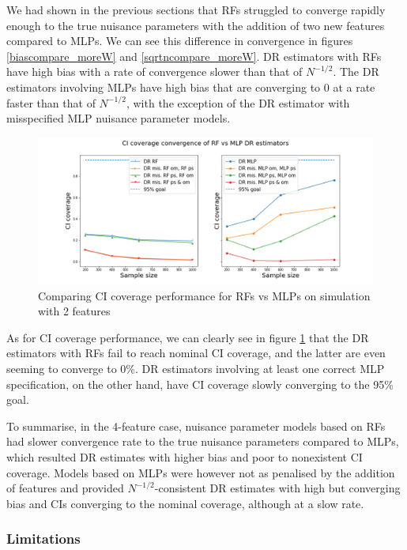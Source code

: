 \documentclass[12pt,twoside]{article}
\begin{document}
We had shown in the previous sections that RFs struggled to converge rapidly enough to the true nuisance parameters with the addition of two new features compared to MLPs. We can see this difference in convergence in figures \ref{biascompare_moreW} and \ref{sqrtncompare_moreW}. DR estimators with RFs have high bias with a rate of convergence slower than that of $N^{-1/2}$. The DR estimators involving MLPs have high bias that are converging to 0 at a rate faster than that of $N^{-1/2}$, with the exception of the DR estimator with misspecified MLP nuisance parameter models.

\begin{figure}[h!]
    \centering
    \includegraphics[width = 0.9\columnwidth]{figures/CIcompare_moreW.png}
    \caption{Comparing CI coverage performance for RFs vs MLPs on simulation with 2 features}
    \label{CIcompare_moreW}
\end{figure}

As for CI coverage performance, we can clearly see in figure \ref{CIcompare_moreW} that the DR estimators with RFs fail to reach nominal CI coverage, and the latter are even seeming to converge to 0\%. DR estimators involving at least one correct MLP specification, on the other hand, have CI coverage slowly converging to the 95\% goal.

To summarise, in the 4-feature case, nuisance parameter models based on RFs had slower convergence rate to the true nuisance parameters compared to MLPs, which resulted DR estimates with higher bias and poor to nonexistent CI coverage. Models based on MLPs were however not as penalised by the addition of features and provided $N^{-1/2}$-consistent DR estimates with high but converging bias and CIs converging to the nominal coverage, although at a slow rate.

\subsubsection{Limitations}
\end{document}
